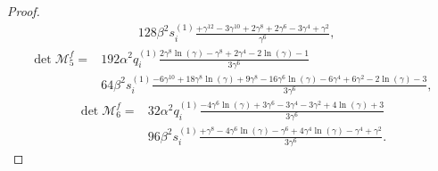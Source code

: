 \documentclass[11pt,letterpaper]{amsart}
\newcommand{\mM}{\mathcal{M}}
\theoremstyle{definition}
\theoremstyle{remark}
\numberwithin{equation}{section}
\begin{document}
\begin{proof}
\begin{equation}
\begin{split}
        &128\beta^{2}s^{(1)}_i\frac{+\gamma^{12} - 3\gamma^{10} + 2\gamma^{8} + 2\gamma^{6} - 3\gamma^{4} + \gamma^{2}}{\gamma^{6}},
    \end{split}
\end{equation}
\begin{equation}
    \begin{split}
        \det \mM^f_5=&192\alpha^{2}q^{(1)}_i\frac{2\gamma^{8}\ln(\gamma) - \gamma^{8} + 2\gamma^{4} - 2\ln(\gamma) - 1}{3\gamma^{6}}\\
        &64\beta^{2}s^{(1)}_i\frac{- 6\gamma^{10} + 18\gamma^{8}\ln(\gamma) + 9\gamma^{8} - 16\gamma^{6}\ln(\gamma) - 6\gamma^{4} + 6\gamma^{2} - 2\ln(\gamma) - 3}{3\gamma^{6}},
    \end{split}
\end{equation}
\begin{equation}
    \begin{split}
        \det \mM^f_6=&32\alpha^{2}q^{(1)}_i\frac{-4\gamma^{6}\ln(\gamma) + 3\gamma^{6} - 3\gamma^{4} - 3\gamma^{2} + 4\ln(\gamma) + 3}{3\gamma^{6}}\\
        &96\beta^{2}s^{(1)}_i\frac{+ \gamma^{8} - 4\gamma^{6}\ln(\gamma) - \gamma^{6} + 4\gamma^{4}\ln(\gamma) - \gamma^{4} + \gamma^{2}}{3\gamma^{6}}.
    \end{split}
\end{equation}


\end{proof}
\end{document}
